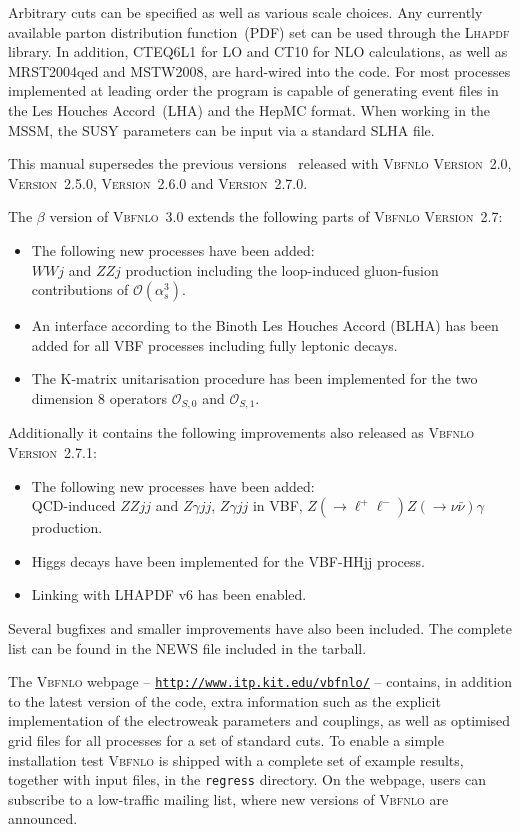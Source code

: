 \documentclass[english,12pt]{article}
\begin{document}
Arbitrary cuts can be specified as well as various scale choices. Any currently
available parton distribution function~(PDF) set can be used through the
\textsc{Lhapdf} library.  In addition, 
CTEQ6L1 for LO and CT10 for NLO calculations, as well as MRST2004qed and MSTW2008, are
hard-wired into the code. For most processes implemented at leading order the
program is capable of generating event files in the Les Houches Accord~(LHA) and the 
HepMC format.  When working in the MSSM, the SUSY parameters can be input via a
standard SLHA file.

This manual supersedes the previous versions~\cite{Arnold:2008rz,Arnold:2011wj,Arnold:2011wjv2} released with
\textsc{Vbfnlo Version~2.0}, \textsc{Version~2.5.0}, \textsc{Version~2.6.0} and \textsc{Version~2.7.0}.

\noindent The $\beta$ version of \textsc{Vbfnlo~3.0} extends the following parts of \textsc{Vbfnlo Version~2.7}:
\begin{itemize}
 \item The following new processes have been added: \\
       $WWj$ and $ZZj$ production including the loop-induced gluon-fusion
       contributions of $\mathcal{O}(\alpha_s^3)$.
 \item An interface according to the Binoth Les Houches Accord
       (BLHA) has been added for all VBF processes
       including fully leptonic decays.
 \item The K-matrix unitarisation procedure has been implemented 
       for the two dimension 8 operators $\mathcal{O}_{S,0}$ and $\mathcal{O}_{S,1}$. 
\end{itemize}
Additionally it contains the following improvements also released as \textsc{Vbfnlo Version~2.7.1}:
\begin{itemize}
 \item The following new processes have been added: \\
       QCD-induced $ZZjj$ and $Z\gamma jj$, $Z\gamma jj$ in VBF, $Z(\rightarrow \ell^+ \ell^-)Z(\rightarrow \nu \bar{\nu})\gamma$ production.
 \item Higgs decays have been implemented for the VBF-HHjj process.
 \item Linking with LHAPDF v6 has been enabled.
\end{itemize}
Several bugfixes and smaller improvements have also been included. The
complete list can be found in the NEWS file included in the tarball.

The \textsc{Vbfnlo} webpage -- 
\href{http://www.itp.kit.edu/vbfnlo/}{\tt http://www.itp.kit.edu/vbfnlo/} -- contains, in addition to
the latest version of the code, extra information such as the explicit
implementation of the electroweak parameters and couplings, as well as optimised
grid files for all processes for a set of standard cuts.  To enable a simple installation test
\textsc{Vbfnlo} is shipped with a complete set of example results, together
with input files, in the {\tt regress} directory.  On the webpage, users can subscribe to
a low-traffic mailing list, where new versions of \textsc{Vbfnlo} are announced.
\end{document}
